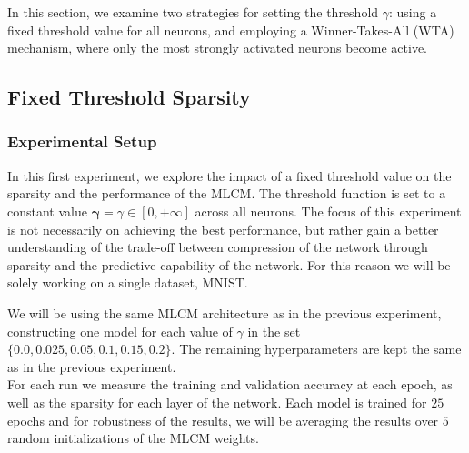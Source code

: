 \documentclass[a4paper,12pt]{report}
\begin{document}
In this section, we examine two strategies for setting the threshold $\gamma$: using 
a fixed threshold value for all neurons, and employing a Winner-Takes-All (WTA) 
mechanism, where only the most strongly activated neurons become active.

\subsection{Fixed Threshold Sparsity}
\subsubsection*{Experimental Setup}
In this first experiment, we explore the impact of a fixed threshold value on the 
sparsity and the performance of the MLCM. The threshold function is set to a constant 
value $\boldsymbol{\gamma} = \gamma \in \left[0, +\infty\right]$ across all neurons. The focus of this experiment 
is not necessarily on achieving the best performance, but rather gain a better 
understanding of the trade-off between compression of the network through sparsity and 
the predictive capability of the network. For this reason we will be solely working on 
a single dataset, MNIST.

We will be using the same MLCM architecture as in the previous experiment, constructing 
one model for each value of $\gamma$ in the set $\{0.0, 0.025, 0.05, 0.1, 
0.15, 0.2\}$. The remaining hyperparameters are kept the same as in the previous 
experiment. \\
For each run we measure the training and validation accuracy at each epoch, as well as 
the sparsity for each layer of the network. Each model is trained for $25$ epochs and 
for robustness of the results, we will be averaging the results over $5$ random 
initializations of the MLCM weights.
\end{document}

